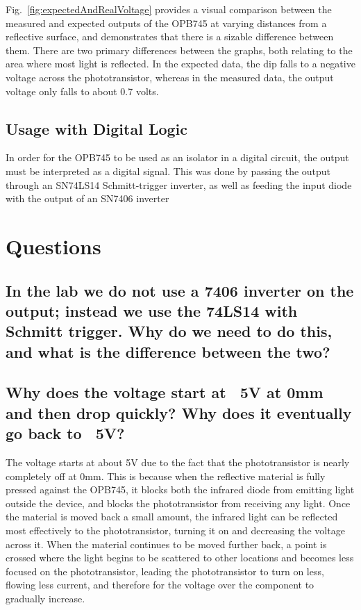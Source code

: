 \documentclass[conference]{IEEEtran}
\begin{document}
Fig.~\ref{fig:expectedAndRealVoltage} provides a visual comparison between the measured and expected
outputs of the OPB745 at varying distances from a reflective surface, and demonstrates that there is
a sizable difference between them. There are two primary differences between the graphs, both relating to
the area where most light is reflected. In the expected data, the dip falls to a negative voltage across
the phototransistor, whereas in the measured data, the output voltage only falls to about 0.7 volts.

\subsection{Usage with Digital Logic}

In order for the OPB745 to be used as an isolator in a digital
circuit, the output must be interpreted as a digital signal.
This was done by passing the output through an SN74LS14 
Schmitt-trigger inverter, as
well as feeding the input diode with the output of an SN7406
inverter

\section{Questions}

\subsection{In the lab we do not use a 7406 inverter on the output; instead we use the 74LS14 with Schmitt
trigger. Why do we need to do this, and what is the difference between the two?}

\subsection{Why does the voltage start at ~5V at 0mm and then drop quickly? Why does it eventually go
back to ~5V?}

The voltage starts at about 5V due to the fact that the
phototransistor is nearly completely off at 0mm. This is
because when the reflective material is fully pressed against
the OPB745, it blocks both the infrared diode from emitting
light outside the device, and blocks the phototransistor from
receiving any light. Once the material is moved back a small amount, the
infrared light can be reflected most effectively to the
phototransistor, turning it on and decreasing the voltage
across it. When the material continues to be moved further 
back, a point is crossed where the light begins to be scattered
to other locations and becomes less focused on the
phototransistor, leading the phototransistor to turn on less,
flowing less current, and therefore for the voltage over the
component to gradually increase.
\end{document}
